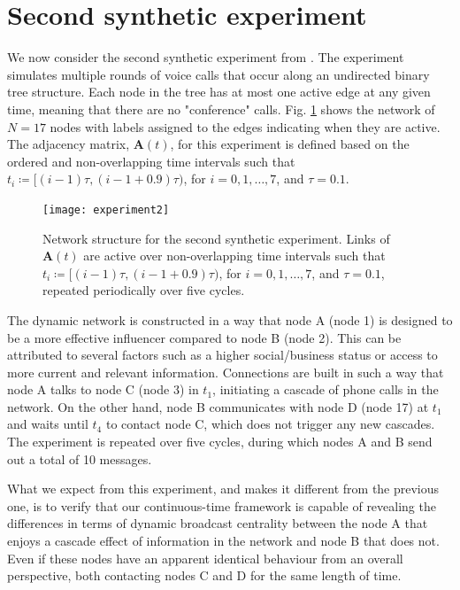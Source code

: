 \section{Second synthetic experiment}
\label{sec:synexp2}
We now consider the second synthetic experiment from \cite{grindrod2014dynamical}. The experiment simulates multiple rounds of voice calls that occur along an undirected binary tree structure. Each node in the tree has at most one active edge at any given time, meaning that there are no "conference" calls. Fig. \ref{fig:exp2} shows the network of $N=17$ nodes with labels assigned to the edges indicating when they are active. The adjacency matrix, $\mathbf{A}(t)$, for this experiment is defined based on the ordered and non-overlapping time intervals such that $t_i\coloneqq[(i − 1)\tau , (i − 1 + 0.9)\tau )$, for $i=0, 1, \dots , 7$, and $\tau =0.1$.

\begin{figure}[h]\centering
    \texttt{[image: experiment2]}
    \caption{Network structure for the second synthetic experiment. Links of $\mathbf{A}(t)$ are active over non-overlapping time intervals such that $t_i\coloneqq[(i − 1)\tau , (i − 1 + 0.9)\tau )$, for $i=0, 1, \dots , 7$, and $\tau =0.1$, repeated periodically over five cycles.}
    \label{fig:exp2}
    \bigskip
\end{figure}

The dynamic network is constructed in a way that node A (node 1) is designed to be a more effective influencer compared to node B (node 2). This can be attributed to several factors such as a higher social/business status or access to more current and relevant information. Connections are built in such a way that node A talks to node C (node 3) in $t_1$, initiating a cascade of phone calls in the network. On the other hand, node B communicates with node D (node 17) at $t_1$ and waits until $t_4$ to contact node C, which does not trigger any new cascades. The experiment is repeated over five cycles, during which nodes A and B send out a total of 10 messages. 

What we expect from this experiment, and makes it different from the previous one, is to verify that our continuous-time framework is capable of revealing the differences in terms of dynamic broadcast centrality between the node A that enjoys a cascade effect of information in the network and node B that does not. Even if these nodes have an apparent identical behaviour from an overall perspective, both contacting nodes C and D for the same length of time.

